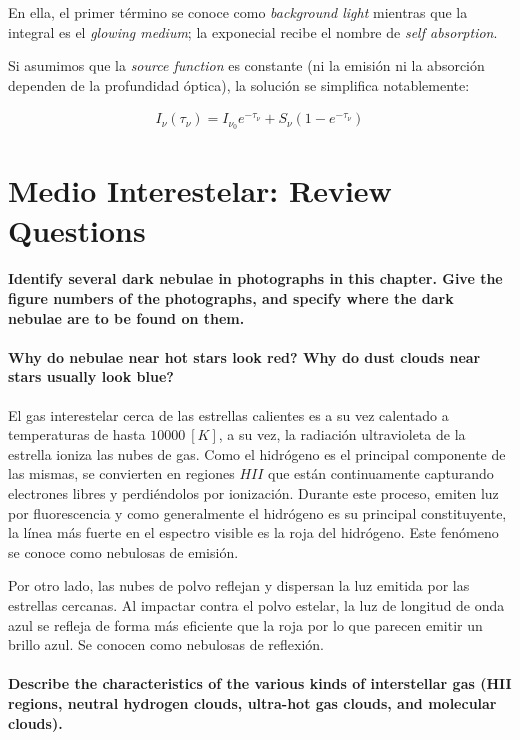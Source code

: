 \documentclass{tufte-handout}
\begin{document}
En ella, el primer término se conoce como \emph{background light} mientras que la integral es el \emph{glowing medium}; la exponecial recibe el nombre de \emph{self absorption}.

Si asumimos que la \emph{source function} es constante (ni la emisión ni la absorción dependen de la profundidad óptica), la solución se simplifica notablemente:

\begin{align}
I_\nu(\tau_\nu) = I_{\nu_0}e^{-\tau_\nu} + S_\nu (1-e^{-\tau_\nu})
\end{align}

\section{Medio Interestelar: Review Questions}

\paragraph{Identify several dark nebulae in photographs in this chapter. Give the figure numbers of the photographs,
and specify where the dark nebulae are to be found on them.}

\paragraph{\textbf{Why do nebulae near hot stars look red? Why do dust clouds near stars usually look blue?}}

El gas interestelar cerca de las estrellas calientes es a su vez calentado a temperaturas de hasta $10000~[K]$, a su vez, la radiación ultravioleta de la estrella ioniza las nubes de gas. Como el hidrógeno es el principal componente de las mismas, se convierten en regiones $HII$ que están continuamente capturando electrones libres y perdiéndolos por ionización. Durante este proceso, emiten luz por fluorescencia y como generalmente el hidrógeno es su principal constituyente, la línea más fuerte en el espectro visible es la roja del hidrógeno. Este fenómeno se conoce como nebulosas de emisión.

Por otro lado, las nubes de polvo reflejan y dispersan la luz emitida por las estrellas cercanas. Al impactar contra el polvo estelar, la luz de longitud de onda azul se refleja de forma más eficiente que la roja por lo que parecen emitir un brillo azul. Se conocen como nebulosas de reflexión.

\paragraph{\textbf{Describe the characteristics of the various kinds of interstellar gas (HII regions, neutral hydrogen clouds,
ultra-hot gas clouds, and molecular clouds).}}
\end{document}
